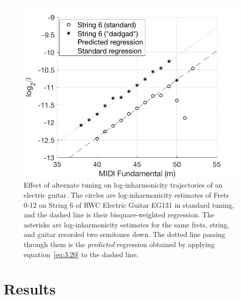 \documentclass[convention,peer-reviewed]{aesconf}
\begin{document}
\begin{figure}[!htbp] 
\label{fig:tuning-eg}
\centering
\includegraphics[scale=0.25]{tuning-eg}
%
\caption{Effect of alternate tuning on log-inharmonicity trajectories of an electric guitar. The circles are log-inharmonicity estimates of Frets 0-12 on String 6 of RWC Electric Guitar EG131 in standard tuning, and the dashed line is their bisquare-weighted regression. The asterisks are log-inharmonicity estimates for the same frets, string, and guitar recorded two semitones down. The dotted line passing through them is the \textit{predicted} regression obtained by applying equation~\eqref{eq:3.20} to the dashed line.}
\end{figure}

\section{Results}  
\end{document}

